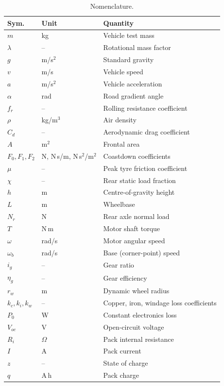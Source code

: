 \documentclass[twocolumn]{article}
\begin{document}
\begin{table}[H]
\centering
\caption{Nomenclature.}
\label{tab:nomen}
\footnotesize
\begin{tabular}{@{}ll>{\raggedright\arraybackslash}p{}@{}}
\toprule
\textbf{Sym.} & \textbf{Unit} & \textbf{Quantity} \\
\midrule
$m$              & kg          & Vehicle test mass \\
$\lambda$        & --          & Rotational mass factor \\
$g$              & m/s$^2$     & Standard gravity \\
$v$              & m/s         & Vehicle speed \\
$a$              & m/s$^2$     & Vehicle acceleration \\
$\alpha$         & rad         & Road gradient angle \\
$f_r$            & --          & Rolling resistance coefficient \\
$\rho$           & kg/m$^3$    & Air density \\
$C_d$            & --          & Aerodynamic drag coefficient \\
$A$              & m$^2$       & Frontal area \\
$F_0,F_1,F_2$    & N, N\,s/m, N\,s$^2$/m$^2$ & Coastdown coefficients \\
$\mu$            & --          & Peak tyre friction coefficient \\
$\chi$           & --          & Rear static load fraction \\
$h$              & m           & Centre-of-gravity height \\
$L$              & m           & Wheelbase \\
$N_r$            & N           & Rear axle normal load \\
$T$              & N\,m        & Motor shaft torque \\
$\omega$         & rad/s       & Motor angular speed \\
$\omega_b$       & rad/s       & Base (corner-point) speed \\
$i_g$            & --          & Gear ratio \\
$\eta_g$         & --          & Gear efficiency \\
$r_w$            & m           & Dynamic wheel radius \\
$k_c,k_i,k_w$    & --          & Copper, iron, windage loss coefficients \\
$P_0$            & W           & Constant electronics loss \\
$V_{oc}$         & V           & Open-circuit voltage \\
$R_i$            & $\Omega$    & Pack internal resistance \\
$I$              & A           & Pack current \\
$z$              & --          & State of charge \\
$q$              & A\,h        & Pack charge \\
\bottomrule
\end{tabular}
\end{table}
\end{document}
